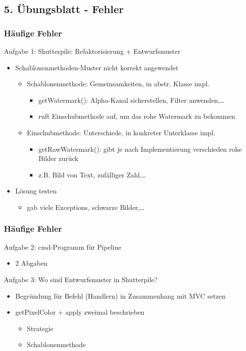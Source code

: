 \documentclass[18pt]{beamer}
\begin{document}
	\subsection{5. Übungsblatt - Fehler}
	\begin{frame}
		\frametitle{Häufige Fehler}
		\begin{block}{Aufgabe 1: Shutterpile: Refaktorisierung + Entwurfsmuster}
			\begin{itemize}
				\item Schablonenmethoden-Muster nicht korrekt angewendet
				\begin{itemize}
					\item Schablonenmethode: Gemeinsamkeiten, in abstr. Klasse impl. 
					\begin{itemize}\pause
						\item getWatermark(): Alpha-Kanal sicherstellen, Filter anwenden,\dots
						\item ruft Einschubmethode auf, um das rohe Watermark zu bekommen
					\end{itemize}\pause
					\item Einschubmethode: Unterschiede, in konkreter Unterklasse impl.
					\begin{itemize}\pause
						\item getRawWatermark(): gibt je nach Implementierung verschieden rohe Bilder zurück
						\item z.B. Bild von Text, zufälliger Zahl,\dots
					\end{itemize}
				\end{itemize}\pause
				\item Lösung testen
				\begin{itemize}
					\item gab viele Exceptions, schwarze Bilder,\dots
				\end{itemize}
			\end{itemize}
		\end{block}
	\end{frame}

	\begin{frame}
		\frametitle{Häufige Fehler}
		\begin{block}{Aufgabe 2: cmd-Programm für Pipeline}
			\begin{itemize}
				\item 2 Abgaben 
			\end{itemize}
		\end{block}
		\pause 
		\begin{block}{Aufgabe 3: Wo sind Entwurfsmuster in Shutterpile?}
			\begin{itemize}
				\item Begründung für Befehl (Handlern) in Zusammenhang mit MVC setzen \pause
				\item getPixelColor + apply zweimal beschrieben 
				\begin{itemize}
					\item Strategie
					\item Schablonenmethode
				\end{itemize}
			\end{itemize}
		\end{block}
	\end{frame}
\end{document}
